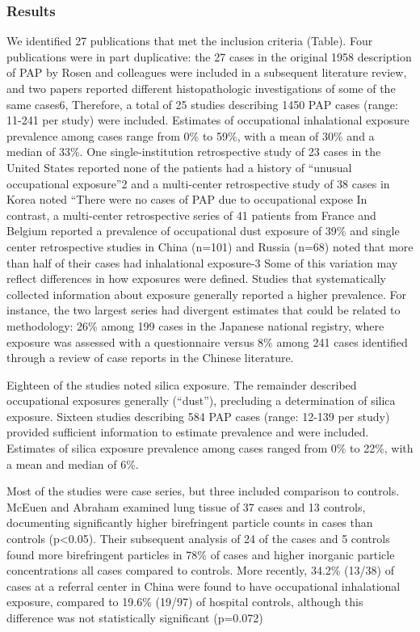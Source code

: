 \documentclass[a4
er,12pt]{article}
\begin{document}
\subsubsection{Results}
We identified 27 publications that met the inclusion criteria (Table).  Four publications were in part duplicative: the 27 cases in the original 1958 description of PAP by Rosen and colleagues were included in a subsequent literature review, and two papers reported different histopathologic investigations of some of the same cases6,  Therefore, a total of 25 studies describing 1450 PAP cases (range: 11-241 per study) were included.  Estimates of occupational inhalational exposure prevalence
among cases range from 0\% to 59\%, with a mean of 30\% and a median of 33\%.  One single-institution retrospective study of 23 cases in the United States reported none of the patients had a history of “unusual occupational exposure”2 and a multi-center retrospective study of 38 cases in Korea noted “There were no cases of PAP due to occupational expose  In contrast, a multi-center retrospective series of 41 patients from France and Belgium reported a prevalence of occupational dust exposure
of 39\% and single center retrospective studies in China (n=101) and Russia (n=68) noted that more than half of their cases had inhalational exposure-3  Some of this variation may reflect differences in how exposures were defined.  Studies that systematically collected information about exposure generally reported a higher prevalence.  For instance, the two largest series had divergent estimates that could be related to methodology: 26\% among 199 cases in the Japanese national
registry, where exposure was assessed with a questionnaire versus 8\% among 241 cases identified through a review of case reports in the Chinese literature.

Eighteen of the studies noted silica exposure.  The remainder described occupational exposures generally (“dust”), precluding a determination of silica exposure.  Sixteen studies describing 584 PAP cases (range: 12-139 per study) provided sufficient information to estimate prevalence and were included.  Estimates of silica exposure prevalence among cases ranged from 0\% to 22\%, with a mean and median of 6\%.  

Most of the studies were case series, but three included comparison to controls.  McEuen and Abraham examined lung tissue of 37 cases and 13 controls, documenting significantly higher birefringent particle counts in cases than controls (p<0.05).  Their subsequent analysis of 24 of the cases and 5 controls found more birefringent particles in 78\% of cases and higher inorganic particle concentrations all cases compared to controls.  More recently, 34.2\% (13/38) of cases at a referral center
in China were found to have occupational inhalational exposure, compared to 19.6\% (19/97) of hospital controls, although this difference was not statistically significant (p=0.072)   
\end{document}
